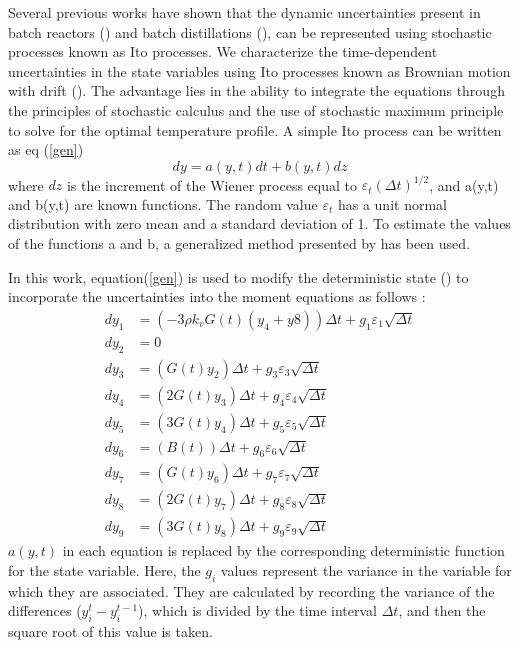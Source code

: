 \documentclass[3p,times,authoryear]{elsarticle}
\begin{document}
Several previous works have shown that the dynamic uncertainties present in batch reactors (\cite{benavides}) and batch distillations (\cite{diwekar}), can be represented using stochastic processes known as Ito processes. We characterize the time-dependent uncertainties in the state variables using Ito processes known as Brownian motion with drift (\cite{diwekar,wong}). The advantage lies in the ability to integrate the equations through the principles of stochastic calculus and the use of stochastic maximum principle to solve for the optimal temperature profile. 
A simple Ito process can be written as eq (\ref{gen})
\begin{equation} \label{gen}
dy = a(y,t)dt + b(y,t)dz
\end{equation}
where $dz$ is the increment of the Wiener process equal to $\varepsilon_{t}(\Delta t)^{1/2}$, and a(y,t) and b(y,t) are known functions. The random value $\varepsilon_{t}$ has a unit normal distribution with zero mean and a standard deviation of 1. To estimate the values of the functions a and b, a generalized method presented by \cite{diwekar} has been used.\par
In this work, equation(\ref{gen}) is used to modify the deterministic state () to incorporate the uncertainties into the moment equations as follows :
\begin{align}
dy_{1} &= \left(-3\rho k_{v}G(t)(y_{4}+y{8})\right)\Delta t + g_{1}\varepsilon_{1}\sqrt{\Delta t} \label{steq1}\\
dy_{2} &= 0 \\
dy_{3} &= (G(t)y_{2})\Delta t +g_{3}\varepsilon_{3}\sqrt{\Delta t} \\
dy_{4} &= (2G(t)y_{3})\Delta t + g_{4}\varepsilon_{4}\sqrt{\Delta t} \\
dy_{5} &= (3G(t)y_{4})\Delta t + g_{5}\varepsilon_{5}\sqrt{\Delta t} \\
dy_{6} &= (B(t))\Delta t + g_{6}\varepsilon_{6}\sqrt{\Delta t} \\
dy_{7} &= (G(t)y_{6})\Delta t + g_{7}\varepsilon_{7}\sqrt{\Delta t} \\
dy_{8} &= (2G(t)y_{7})\Delta t +g_{8}\varepsilon_{8}\sqrt{\Delta t} \\
dy_{9} &= (3G(t)y_{8})\Delta t + g_{9}\varepsilon_{9}\sqrt{\Delta t} \label{steq2} 
\end{align}
$a(y,t)$ in each equation is replaced by the corresponding deterministic function for the state variable. Here, the $g_{i}$ values represent the variance in the variable for which they are associated. They are calculated by recording the variance of the differences ($y_{i}^{t} - y_{i}^{t-1}$), which is divided by the time interval $\Delta t$, and then the square root of this value is taken. \par
\end{document}
